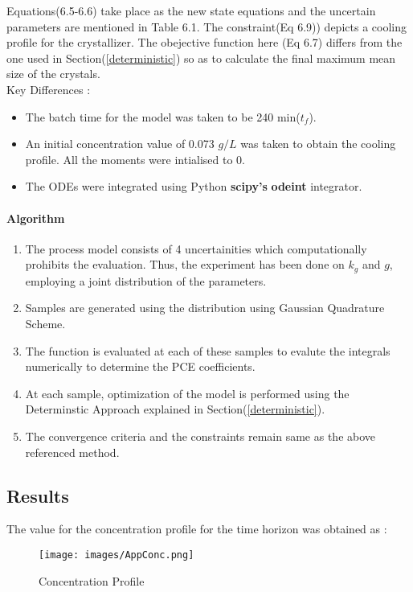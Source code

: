 \documentclass[3p,times,authoryear]{elsarticle}
\begin{document}
Equations(6.5-6.6) take place as the new state equations and the uncertain parameters are mentioned in Table 6.1. The constraint(Eq 6.9)) depicts a cooling profile for the crystallizer. The obejective function here (Eq 6.7) differs from the one used in Section(\ref{deterministic}) so as to calculate the final maximum mean size of the crystals.\\ 
Key Differences :
\begin{itemize}
\item The batch time for the model was taken to be 240 min($t_{f}$).
\item An initial concentration value of 0.073 $g/L$ was taken to obtain the cooling profile. All the moments were intialised to 0.
\item The ODEs were integrated using Python \textbf{scipy's} \textbf{odeint} integrator.
\end{itemize}

\paragraph{Algorithm}
\begin{enumerate}
\item The process model consists of 4 uncertainities which computationally prohibits the evaluation. Thus, the experiment has been done on $k_{g}$ and $g$, employing a joint distribution of the parameters.
\item Samples are generated using the distribution using Gaussian Quadrature Scheme.
\item The function is evaluated at each of these samples to evalute the integrals numerically to determine the PCE coefficients.
\item At each sample, optimization of the model is performed using the Determinstic Approach explained in Section(\ref{deterministic}).
\item The convergence criteria and the constraints remain same as the above referenced method.
\end{enumerate}

\subsection{Results}
The value for the concentration profile for the time horizon was obtained as :
\begin{figure}[h!] 
\begin{center}

\texttt{[image: images/AppConc.png]}
\end{center}
\caption{Concentration Profile}
\end{figure}
\end{document}

